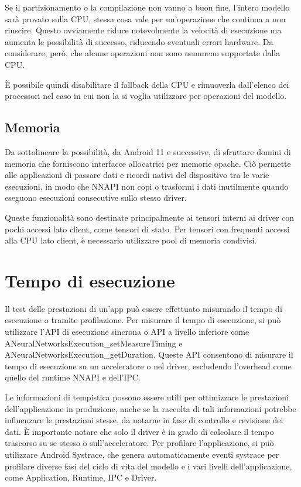 Se il partizionamento o la compilazione non vanno a buon fine, l’intero modello sarà provato sulla CPU, stessa cosa vale per un’operazione che continua a non riuscire. Questo ovviamente riduce notevolmente la velocità
di esecuzione ma aumenta le possibilità di successo, riducendo eventuali errori hardware. Da considerare, però, che alcune operazioni non sono nemmeno supportate dalla CPU.

È possibile quindi disabilitare il fallback della CPU e rimuoverla dall’elenco dei processori nel caso in cui non la si voglia utilizzare per operazioni del modello.

\subsection{Memoria}
Da sottolineare la possibilità, da Android 11 e successive, di sfruttare domini di memoria che forniscono interfacce allocatrici per memorie opache. Ciò permette alle applicazioni di passare dati e ricordi nativi del
dispositivo tra le varie esecuzioni, in modo che NNAPI non copi o trasformi i dati inutilmente quando eseguono esecuzioni consecutive sullo stesso driver.

Queste funzionalità sono destinate principalmente ai tensori interni ai driver con pochi accessi lato client, come tensori di stato. Per tensori con frequenti accessi alla CPU lato client, è necessario utilizzare pool di memoria condivisi.

\section{Tempo di esecuzione}
Il test delle prestazioni di un'app può essere effettuato misurando il tempo di esecuzione o tramite profilazione. Per misurare il tempo di esecuzione, si può utilizzare l'API di esecuzione sincrona o API a livello inferiore
come ANeuralNetworksExecution\_setMeasureTiming e ANeuralNetworksExecution\_getDuration. Queste API consentono di misurare il tempo di esecuzione su un acceleratore o nel driver, escludendo l'overhead come quello del runtime NNAPI
e dell'IPC.

Le informazioni di tempistica possono essere utili per ottimizzare le prestazioni dell'applicazione in produzione, anche se la raccolta di tali informazioni potrebbe influenzare le prestazioni stesse, da notarne in fase di
controllo e revisione dei dati. È importante notare che solo il driver è in grado di calcolare il tempo trascorso su se stesso o sull'acceleratore.
Per profilare l'applicazione, si può utilizzare Android Systrace, che genera automaticamente eventi systrace per profilare diverse fasi del ciclo di vita del modello e i vari livelli dell'applicazione, come Application,
Runtime, IPC e Driver.

